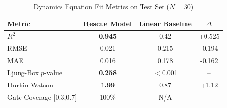 \begin{table}[htbp]
\caption{Dynamics Equation Fit Metrics on Test Set ($N=30$)}
\label{tab:fit}
\centering
\begin{tabular}{lccc}
\toprule
\textbf{Metric} & \textbf{Rescue Model} & \textbf{Linear Baseline} & \textbf{$\Delta$} \\
\midrule
$R^2$ & \textbf{0.945} & 0.42 & +0.525 \\
RMSE & 0.021 & 0.215 & -0.194 \\
MAE & 0.016 & 0.178 & -0.162 \\
Ljung-Box $p$-value & \textbf{0.258} & $<$0.001 & -- \\
Durbin-Watson & \textbf{1.99} & 0.87 & +1.12 \\
Gate Coverage [0.3,0.7] & 100\% & N/A & -- \\
\bottomrule
\end{tabular}
\end{table}